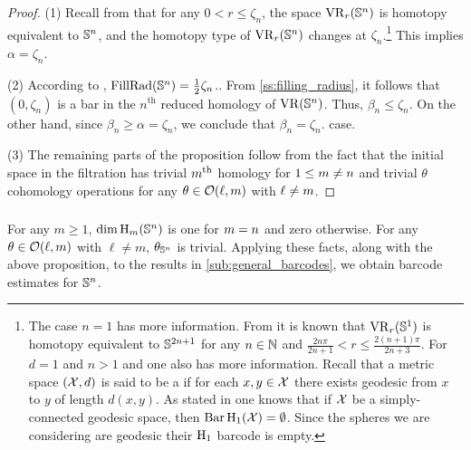 \begin{proof}
	(1) Recall from \cite[Thm.~7.1]{lim2020vietoris} that for any $0 < r \leq \zeta_n$, the space $\operatorname{VR}_r(\mathbb{S}^n)$ is homotopy equivalent to $\mathbb{S}^n$, and the homotopy type of $\operatorname{VR}_r(\mathbb{S}^n)$ changes at $\zeta_n$.\footnote{
		The case $n = 1$ has more information.
		From \cite[Thm.~7.4]{adamaszek2017vietoris} it is known that $\operatorname{VR}_r(\mathbb{S}^1)$ is homotopy equivalent to $\mathbb{S}^{2n+1}$ for any $n \in \mathbb{N}$ and $\frac{2n\pi}{2n+1} < r \leq \frac{2(n+1)\pi}{2n+3}$.
		For $d=1$ and $n > 1$ and one also has more information.
		Recall that a metric space $(\mathcal{X}, d)$ is said to be a  if for each $x, y \in \mathcal{X}$ there exists geodesic from $x$ to $y$ of length $d(x, y)$.
		As stated in \cite[Prop.~7.10]{virk20201} one knows that if $\mathcal{X}$ be a simply-connected geodesic space, then $\operatorname{Bar}\mathrm{H}_1(\mathcal{X}) = \emptyset$.
		Since the spheres we are considering are geodesic their $\mathrm{H}_1$ barcode is empty.}
	This implies $\alpha=\zeta_n$.

	(2) According to \cite{katz1983filling}, \(\mathrm{FillRad}(\mathbb{S}^n) = \frac{1}{2}\zeta_n\)..
	From \cref{ss:filling_radius}, it follows that \((0, \zeta_n)\) is a bar in the \(n^{\text{th}}\) reduced homology of \(\operatorname{VR} (\mathbb{S}^n)\).
	Thus, \(\beta_n \leq \zeta_n\).
	On the other hand, since \(\beta_n \geq \alpha = \zeta_n\), we conclude that \(\beta_n = \zeta_n\). case.


	(3) The remaining parts of the proposition follow from the fact that the initial space in the filtration has trivial $m^{\mathrm{th}}$ homology for $1\leq m \neq n$ and trivial $\theta$ cohomology operations for any \(\theta \in \mathcal{O}(\ell,m)\) with \(\ell \neq m\).
\end{proof}

\subsubsection{}

For any \(m \geq 1\), \(\dim \operatorname{H}_m(\mathbb{S}^n)\) is one for \(m = n\) and zero otherwise.
For any \(\theta \in \mathcal{O}(\ell, m)\) with \(\ell \neq m\), \(\theta_{\mathbb{S}^n}\) is trivial.
Applying these facts, along with the above proposition, to the results in \cref{sub:general_barcodes}, we obtain barcode estimates for \(\mathbb{S}^n\).

